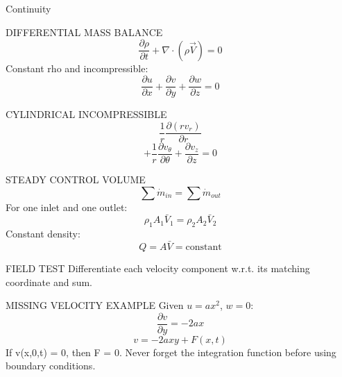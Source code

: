 Continuity

DIFFERENTIAL MASS BALANCE
$$\frac{\partial\rho}{\partial t}+\nabla\cdot(\rho\vec V)=0$$
Constant rho and incompressible:
$$\frac{\partial u}{\partial x}+\frac{\partial v}{\partial y}+\frac{\partial w}{\partial z}=0$$

CYLINDRICAL INCOMPRESSIBLE
$$\frac{1}{r}\frac{\partial(rv_r)}{\partial r}$$
$$+\frac{1}{r}\frac{\partial v_\theta}{\partial\theta}+\frac{\partial v_z}{\partial z}=0$$

STEADY CONTROL VOLUME
$$\sum\dot m_{in}=\sum\dot m_{out}$$
For one inlet and one outlet:
$$\rho_1A_1\bar V_1=\rho_2A_2\bar V_2$$
Constant density:
$$Q=A\bar V=\text{constant}$$

FIELD TEST
Differentiate each velocity component w.r.t. its matching coordinate and sum.

MISSING VELOCITY EXAMPLE
Given $u=ax^2$, $w=0$:
$$\frac{\partial v}{\partial y}=-2ax$$
$$v=-2axy+F(x,t)$$
If v(x,0,t) = 0, then F = 0.
Never forget the integration function before using boundary conditions.
